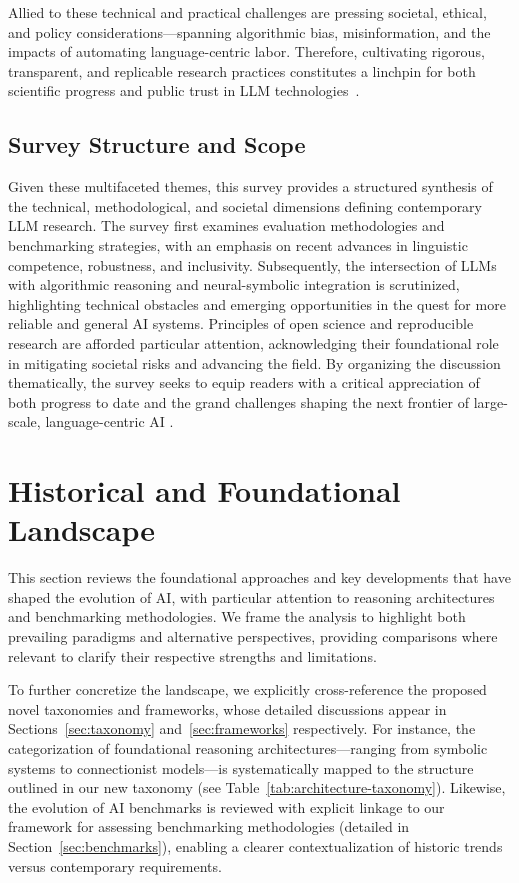 \documentclass[sigconf]{acmart}
\begin{document}
Allied to these technical and practical challenges are pressing societal, ethical, and policy considerations—spanning algorithmic bias, misinformation, and the impacts of automating language-centric labor. Therefore, cultivating rigorous, transparent, and replicable research practices constitutes a linchpin for both scientific progress and public trust in LLM technologies~\cite{ref42,ref54,ref86}.

\subsection{Survey Structure and Scope}

Given these multifaceted themes, this survey provides a structured synthesis of the technical, methodological, and societal dimensions defining contemporary LLM research. The survey first examines evaluation methodologies and benchmarking strategies, with an emphasis on recent advances in linguistic competence, robustness, and inclusivity. Subsequently, the intersection of LLMs with algorithmic reasoning and neural-symbolic integration is scrutinized, highlighting technical obstacles and emerging opportunities in the quest for more reliable and general AI systems. Principles of open science and reproducible research are afforded particular attention, acknowledging their foundational role in mitigating societal risks and advancing the field. By organizing the discussion thematically, the survey seeks to equip readers with a critical appreciation of both progress to date and the grand challenges shaping the next frontier of large-scale, language-centric AI \cite{ref42,ref49,ref54,ref86}.

\section{Historical and Foundational Landscape}

This section reviews the foundational approaches and key developments that have shaped the evolution of AI, with particular attention to reasoning architectures and benchmarking methodologies. We frame the analysis to highlight both prevailing paradigms and alternative perspectives, providing comparisons where relevant to clarify their respective strengths and limitations. 

To further concretize the landscape, we explicitly cross-reference the proposed novel taxonomies and frameworks, whose detailed discussions appear in Sections~\ref{sec:taxonomy} and~\ref{sec:frameworks} respectively. For instance, the categorization of foundational reasoning architectures—ranging from symbolic systems to connectionist models—is systematically mapped to the structure outlined in our new taxonomy (see Table~\ref{tab:architecture-taxonomy}). Likewise, the evolution of AI benchmarks is reviewed with explicit linkage to our framework for assessing benchmarking methodologies (detailed in Section~\ref{sec:benchmarks}), enabling a clearer contextualization of historic trends versus contemporary requirements.
\end{document}

